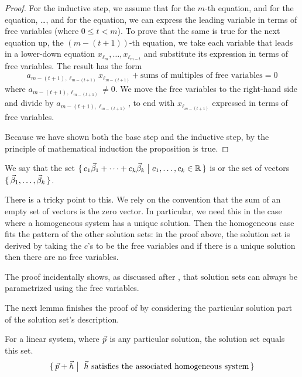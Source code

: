 \begin{proof}
For the inductive step, we assume
that for the \( m \)-th equation,
and for the 
equation, \ldots, and for the  equation, we can
express the leading variable in terms of free variables
(where \( 0\leq t<m \)).
To prove that the same is true for the next equation up, 
the \( (m-(t+1)) \)-th equation, we take each variable that leads
in a lower-down equation \( x_{\ell_m},\ldots,x_{\ell_{m-t}} \) and substitute
its expression in terms of free variables.
The result has the form
\begin{equation*}
  a_{m-(t+1),\ell_{m-(t+1)}}x_{\ell_{m-(t+1)}}+
    \text{sums of multiples of free variables}=0
\end{equation*}
where \( a_{m-(t+1),\ell_{m-(t+1)}}\neq 0 \).
We move the free variables to
the right-hand side and divide by
\( a_{m-(t+1),\ell_{m-(t+1)}} \), to end with
\( x_{\ell_{m-(t+1)}} \) expressed in terms of free variables.

Because we have shown both the base step and the inductive step, by the
principle of mathematical induction the proposition is true.
\end{proof}

We say that the set
$\mbox{$\{\,c_1\vec{\beta}_1+\cdots+c_k\vec{\beta}_k \bigm| c_1,\ldots,c_k\in\mathbb{R}\,\}$}$
is  or  the set of vectors
\( \mbox{$\{\,\smash{\vec{\beta}_1},\ldots,\smash{\vec{\beta}_k}\,\}$} \).

There is a tricky point to this.
We rely on the convention that the sum of an empty set of vectors is the 
zero vector.
In particular, we need this in the case where 
a homogeneous system has a unique solution.
Then the homogeneous case 
fits the pattern of the other solution sets: in the proof above,
the solution set is derived by taking the \( c \)'s to be the free variables
and if there is a unique solution then there are no free variables.

The proof incidentally shows, 
as discussed after , that solution sets can
always be parametrized using the free variables.

The next lemma finishes the proof of  
by considering the particular solution part of the 
solution set's description.

\begin{lemma}  \label{th:GenEqPartHomo}
For a linear system, where $\vec{p}\/$ is any particular solution,
the solution set equals this set.
\begin{equation*}
  \mbox{$\{\,\vec{p}+\vec{h} \bigm| \text{ \( \vec{h} \) satisfies the
                                associated homogeneous system}     \,\}$}
\end{equation*}
\end{lemma}

